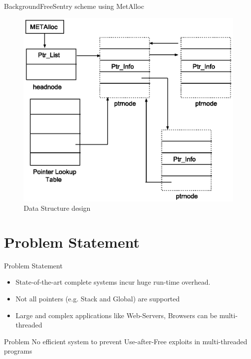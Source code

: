 \documentclass{beamer}
\begin{document}
\begin{frame}{Background}{FreeSentry scheme using MetAlloc}
\begin{figure}[h]
	\centering
	\includegraphics[scale=0.5]{metalloc-freesentry.eps} 
	\caption{Data Structure design} 
\end{figure}

\end{frame}

\section{Problem Statement}
\begin{frame}{Problem Statement}
	\begin{itemize}
	\item State-of-the-art complete systems incur huge run-time overhead. 
	\item Not all pointers (e.g. Stack and Global) are supported 
	\item Large and complex applications like Web-Servers, Browsers can be multi-threaded
	\end{itemize}			
		
	\begin{block}{Problem}
		No efficient system to prevent Use-after-Free exploits in multi-threaded programs 
	\end{block}
\end{frame}
\end{document}
